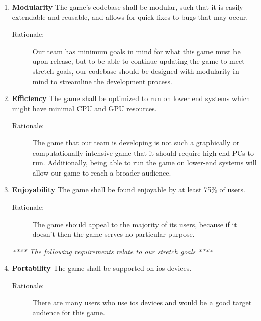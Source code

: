 \begin{enumerate}[label=NFR\arabic*, start=1, left=0pt]
    \item \textbf{Modularity} The game’s codebase shall be modular, such that it is easily extendable and reusable, and allows for quick fixes to bugs that may occur.
    \begin{description}
        \item[Rationale:] Our team has minimum goals in mind for what this game must be upon release, but to be able to continue updating the game to meet stretch goals, our codebase should be designed with modularity in mind to streamline the development process.
    \end{description}

    \item \textbf{Efficiency} The game shall be optimized to run on lower end systems which might have minimal CPU and GPU resources.
    \begin{description}
        \item[Rationale:] The game that our team is developing is not such a graphically or computationally intensive game that it should require high-end PCs to run. Additionally, being able to run the game on lower-end systems will allow our game to reach a broader audience.
    \end{description}

    \item \textbf{Enjoyability} The game shall be found enjoyable by at least 75\% of users.
    \begin{description}
        \item[Rationale:] The game should appeal to the majority of its users, because if it doesn't then the game serves no particular purpose.
    \end{description}

    \textit{**** The following requirements relate to our stretch goals ****}
    \item \textbf{Portability} The game shall be supported on ios devices.
    \begin{description}
        \item[Rationale:] There are many users who use ios devices and would be a good target audience for this game.
    \end{description}

\end{enumerate}